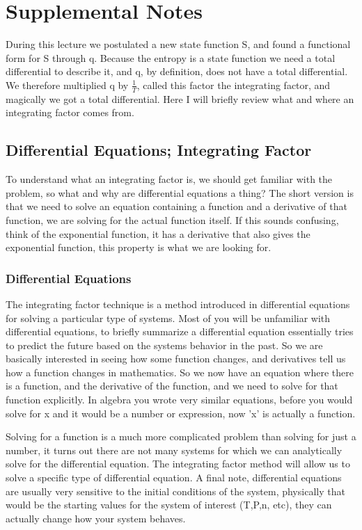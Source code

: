 \documentclass{article}
\begin{document}
\section{Supplemental Notes}
During this lecture we postulated a new state function S, and found a functional form for S through q. 
Because the entropy is a state function we need a total differential to describe it, and q, by definition, does not have a total differential. 
We therefore multiplied q by $\frac{1}{T}$, called this factor the integrating factor, and magically we got a total differential.
Here I will briefly review what and where an integrating factor comes from.

\subsection{Differential Equations; Integrating Factor}
To understand what an integrating factor is, we should get familiar with the problem, so what and why are differential equations a thing?
The short version is that we need to solve an equation containing a function and a derivative of that function, we are solving for the actual function itself.
If this sounds confusing, think of the exponential function, it has a derivative that also gives the exponential function, this property is what we are looking for.

\subsubsection{Differential Equations}
The integrating factor technique is a method introduced in differential equations for solving a particular type of systems.
Most of you will be unfamiliar with differential equations, to briefly summarize a differential equation essentially tries to predict the future based on the systems behavior in the past. 
So we are basically interested in seeing how some function changes, and derivatives tell us how a function changes in mathematics.
So we now have an equation where there is a function, and the derivative of the function, and we need to solve for that function explicitly.
In algebra you wrote very similar equations, before you would solve for x and it would be a number or expression, now 'x' is actually a function.

Solving for a function is a much more complicated problem than solving for just a number, it turns out there are not many systems for which we can analytically solve for the differential equation. 
The integrating factor method will allow us to solve a specific type of differential equation. 
A final note, differential equations are usually very sensitive to the initial conditions of the system, physically that would be the starting values for the system of interest (T,P,n, etc), they can actually change how your system behaves. 
\end{document}
